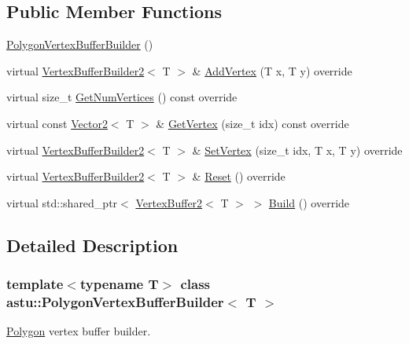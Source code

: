 \subsection*{Public Member Functions}
\begin{DoxyCompactItemize}
\item 
\hyperlink{classastu_1_1PolygonVertexBufferBuilder_aed6bbe544ea60764aa0ef1068a4e01d9}{Polygon\+Vertex\+Buffer\+Builder} ()
\item 
virtual \hyperlink{classastu_1_1VertexBufferBuilder2}{Vertex\+Buffer\+Builder2}$<$ T $>$ \& \hyperlink{classastu_1_1PolygonVertexBufferBuilder_aed81ba280e667b0ed13ca73853f2f426}{Add\+Vertex} (T x, T y) override
\item 
virtual size\+\_\+t \hyperlink{classastu_1_1PolygonVertexBufferBuilder_a4fd022aa954b7f41db8c34349286e3e3}{Get\+Num\+Vertices} () const override
\item 
virtual const \hyperlink{classastu_1_1Vector2}{Vector2}$<$ T $>$ \& \hyperlink{classastu_1_1PolygonVertexBufferBuilder_ac8ae6ab6039dde91530a79000ac3da3e}{Get\+Vertex} (size\+\_\+t idx) const override
\item 
virtual \hyperlink{classastu_1_1VertexBufferBuilder2}{Vertex\+Buffer\+Builder2}$<$ T $>$ \& \hyperlink{classastu_1_1PolygonVertexBufferBuilder_a64c4253a91903f0650145dc10c4d356b}{Set\+Vertex} (size\+\_\+t idx, T x, T y) override
\item 
virtual \hyperlink{classastu_1_1VertexBufferBuilder2}{Vertex\+Buffer\+Builder2}$<$ T $>$ \& \hyperlink{classastu_1_1PolygonVertexBufferBuilder_a1d0b4429c0fefa106f056a6406ba1d89}{Reset} () override
\item 
virtual std\+::shared\+\_\+ptr$<$ \hyperlink{classastu_1_1VertexBuffer2}{Vertex\+Buffer2}$<$ T $>$ $>$ \hyperlink{classastu_1_1PolygonVertexBufferBuilder_a4e598b21be17c556a444da88f2388319}{Build} () override
\end{DoxyCompactItemize}


\subsection{Detailed Description}
\subsubsection*{template$<$typename T$>$\newline
class astu\+::\+Polygon\+Vertex\+Buffer\+Builder$<$ T $>$}

\hyperlink{classastu_1_1Polygon}{Polygon} vertex buffer builder. 

